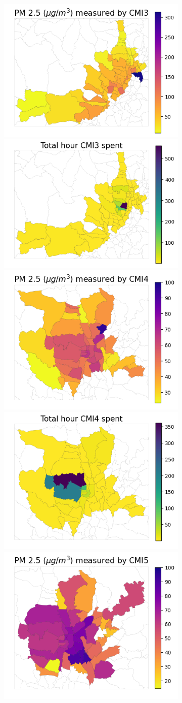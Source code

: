 \begin{figure}
\begin{subfigure}[t]{0.49\textwidth}
        \includegraphics[width=.49\linewidth]{figures/map/CMI3_PM25.png}%
        \includegraphics[width=.49\linewidth]{figures/map/CMI3_time.png}
        \includegraphics[width=.49\linewidth]{figures/map/CMI4_PM25.png}%
        \includegraphics[width=.49\linewidth]{figures/map/CMI4_time.png}
        \includegraphics[width=.49\linewidth]{figures/map/CMI5_PM25.png}%

\end{subfigure}
\end{figure}
